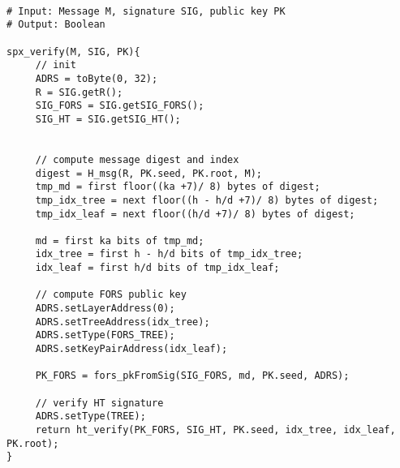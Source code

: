 \begin{lstlisting}[breaklines=true, label=alg:spx:ver, mathescape, language=pseudoc,
                   caption=\spxverify\ -- Verify a \spx signature \spxsig on a
   message \msg using a \spx public key \PK]
   
# Input: Message M, signature SIG, public key PK
# Output: Boolean

spx_verify(M, SIG, PK){
     // init
     ADRS = toByte(0, 32);
     R = SIG.getR();
     SIG_FORS = SIG.getSIG_FORS();
     SIG_HT = SIG.getSIG_HT();

     
     // compute message digest and index
     digest = H_msg(R, PK.seed, PK.root, M);
     tmp_md = first floor((ka +7)/ 8) bytes of digest;
     tmp_idx_tree = next floor((h - h/d +7)/ 8) bytes of digest;
     tmp_idx_leaf = next floor((h/d +7)/ 8) bytes of digest;
     
     md = first ka bits of tmp_md;
     idx_tree = first h - h/d bits of tmp_idx_tree;
     idx_leaf = first h/d bits of tmp_idx_leaf;

     // compute FORS public key
     ADRS.setLayerAddress(0);
     ADRS.setTreeAddress(idx_tree);
     ADRS.setType(FORS_TREE);
     ADRS.setKeyPairAddress(idx_leaf);
     
     PK_FORS = fors_pkFromSig(SIG_FORS, md, PK.seed, ADRS);
     
     // verify HT signature
     ADRS.setType(TREE);
     return ht_verify(PK_FORS, SIG_HT, PK.seed, idx_tree, idx_leaf, PK.root);
}
\end{lstlisting}

